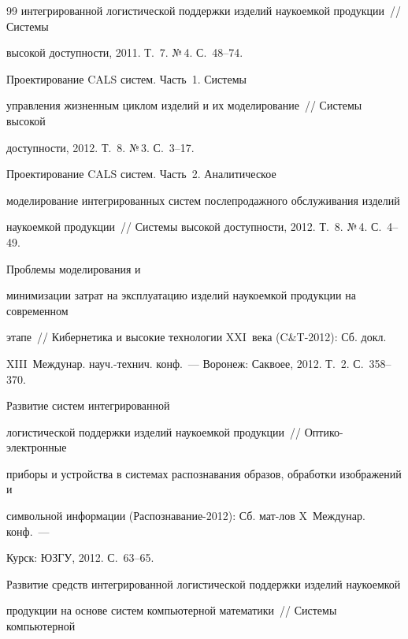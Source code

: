 {{\begin{thebibliography}{99}
интегрированной логистической поддержки изделий наукоемкой продукции~/\!\!/ Системы

высокой доступности, 2011. Т.~7. №\,4. С.~48--74.


 Проектирование CALS систем. Часть~1. Сис\-те\-мы

управления жизненным циклом изделий и их моделирование~/\!\!/ Сис\-те\-мы высокой

доступности, 2012. Т.~8. №\,3. С.~3--17.


 Проектирование CALS систем. Часть~2. Аналитическое

моделирование интегрированных сис\-тем послепродажного обслуживания изделий

наукоемкой продукции~/\!\!/ Сис\-те\-мы высокой доступности, 2012. Т.~8. №\,4. С.~4--49.


 Проблемы моделирования и

минимизации затрат на эксплуатацию изделий наукоемкой продукции на современном

этапе~/\!\!/ Кибернетика и высокие технологии XXI~века (C\&T-2012): Сб. докл.\

XIII~Междунар. науч.-технич. конф.~--- Воронеж: Саквоее, 2012. Т.~2. С.~358--370.


 Развитие систем интегрированной

логистической поддержки изделий наукоемкой продукции~/\!\!/ Оп\-ти\-ко-элек\-трон\-ные

приборы и устройства в системах распознавания образов, обработки изображений и

символьной информации (Распознавание-2012): Сб. мат-лов X~Междунар. конф.~---

Курск: ЮЗГУ, 2012. С.~63--65.



Развитие средств интегрированной логистической поддержки изделий наукоемкой

продукции на основе систем компьютерной математики~/\!\!/ Сис\-те\-мы компьютерной


\end{thebibliography}}}
